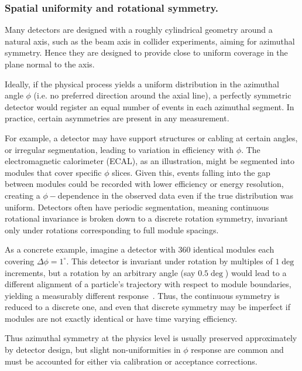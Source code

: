         \subsubsection{Spatial uniformity and rotational symmetry.}
            Many detectors are designed with a roughly cylindrical geometry around a natural axis, such as the beam axis in collider experiments, aiming for azimuthal symmetry.
            Hence they are designed to provide close to uniform coverage in the plane normal to the axis.
            
            Ideally, if the physical process yields a uniform distribution in the azimuthal angle $\phi$ (i.e. no preferred direction around the axial line), a perfectly symmetric detector would register an equal number of events in each azimuthal segment.
            In practice, certain asymmetries are present in any measurement.
            
            For example, a detector may have support structures or cabling at certain angles, or irregular segmentation, leading to variation in efficiency with $\phi$.
            The electromagnetic calorimeter (ECAL), as an illustration, might be segmented into modules that cover specific $\phi$ slices.
            Given this, events falling into the gap between modules could be recorded with lower efficiency or energy resolution, creating a $\phi-$dependence in the observed data even if the true distribution was uniform.
            Detectors often have periodic segmentation, meaning continuous rotational invariance is broken down to a discrete rotation symmetry, invariant only under rotations corresponding to full module spacings.
            
            As a concrete example, imagine a detector with 360 identical modules each covering $\Delta\phi = 1^\circ$.
            This detector is invariant under rotation by multiples of \(1\deg\) increments, but a rotation by an arbitrary angle (say $0.5\deg$) would lead to a different alignment of a particle's trajectory with respect to module boundaries, yielding a measurably different response~\cite{Nabat:2024nce}.
            Thus, the continuous symmetry is reduced to a discrete one, and even that discrete symmetry may be imperfect if modules are not exactly identical or have time varying efficiency.
            
            Thus azimuthal symmetry at the physics level is usually preserved approximately by detector design, but slight non-uniformities in $\phi$ response are common and must be accounted for either via calibration or acceptance corrections.

